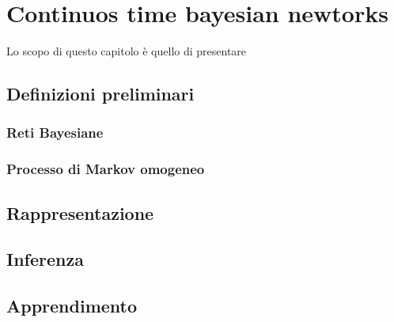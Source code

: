 
\chapter{Continuos time bayesian newtorks}
\label{cap:ctbn}

Lo scopo di questo capitolo è quello di presentare 

\section{Definizioni preliminari}

\subsection{Reti Bayesiane}

\subsection{Processo di Markov omogeneo}

\section{Rappresentazione}

\section{Inferenza}

\section{Apprendimento}


